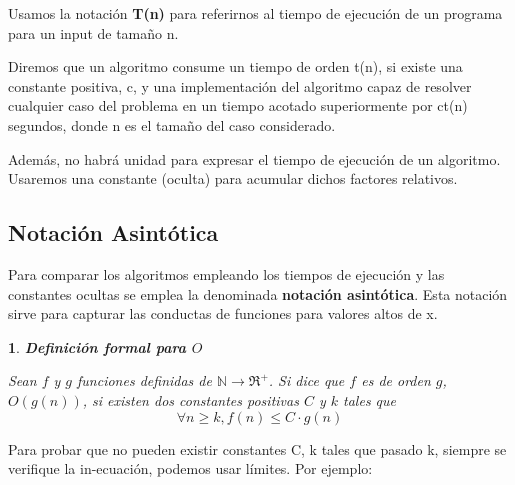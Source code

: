 \documentclass[a4paper, 12pt]{article}
\theoremstyle{plain}
\newtheorem{teorema}{}[section]
\theoremstyle{definition}
\theoremstyle{remark}
\begin{document}
	\textcolor{Azul}{Usamos la notación \textbf{T(n)} para referirnos al tiempo de ejecución de un programa para un input de tamaño n.}
	
	\bigskip
	Diremos que un algoritmo consume un tiempo de orden t(n), si existe una constante positiva, c, y una implementación del algoritmo capaz de resolver cualquier caso del problema en un tiempo acotado superiormente por ct(n) segundos, donde n es el tamaño del caso considerado. 
	
	\bigskip
	\textcolor{Azul}{Además, no habrá unidad para expresar el tiempo de ejecución de un algoritmo. Usaremos una constante (oculta) para acumular dichos factores relativos.}
	
	\bigskip
	\subsection{Notación Asintótica}
	Para comparar los algoritmos empleando los tiempos de ejecución y las constantes ocultas se emplea la denominada \textbf{notación asintótica}. Esta notación sirve para capturar las conductas de funciones para valores altos de x.
	
	\begin{teorema}
		\textbf{Definición formal para $O$}
		
		Sean $f$ y $g$ funciones definidas de $\mathbb{N} \rightarrow \Re^+$. Si dice que $f$ es de orden $g$, $O(g(n))$, si existen dos constantes positivas $C$ y $k$ tales que \[\forall n\geq k,f(n) \leq C\cdot g(n)\]
	\end{teorema}

	\textcolor{Lila}{Para probar que no pueden existir constantes C, k tales que pasado k, siempre se verifique la in-ecuación, podemos usar límites.}
	Por ejemplo:
	
	
\end{document}
